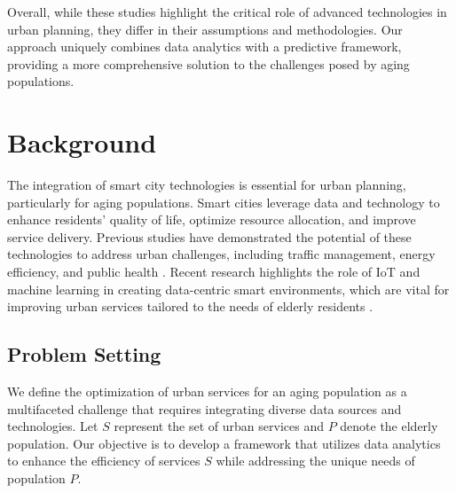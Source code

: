 \documentclass{article} %
\begin{document}
Overall, while these studies highlight the critical role of advanced technologies in urban planning, they differ in their assumptions and methodologies. Our approach uniquely combines data analytics with a predictive framework, providing a more comprehensive solution to the challenges posed by aging populations.
% 
% 

\section{Background}
\label{sec:background}
The integration of smart city technologies is essential for urban planning, particularly for aging populations. Smart cities leverage data and technology to enhance residents' quality of life, optimize resource allocation, and improve service delivery. Previous studies have demonstrated the potential of these technologies to address urban challenges, including traffic management, energy efficiency, and public health \citep{vaswani2017attention, goodfellow2016deep}. Recent research highlights the role of IoT and machine learning in creating data-centric smart environments, which are vital for improving urban services tailored to the needs of elderly residents \citep{Ullah2023SmartCT}.

\subsection{Problem Setting}
\label{subsec:problem_setting}
We define the optimization of urban services for an aging population as a multifaceted challenge that requires integrating diverse data sources and technologies. Let \( S \) represent the set of urban services and \( P \) denote the elderly population. Our objective is to develop a framework that utilizes data analytics to enhance the efficiency of services \( S \) while addressing the unique needs of population \( P \).
\end{document}
